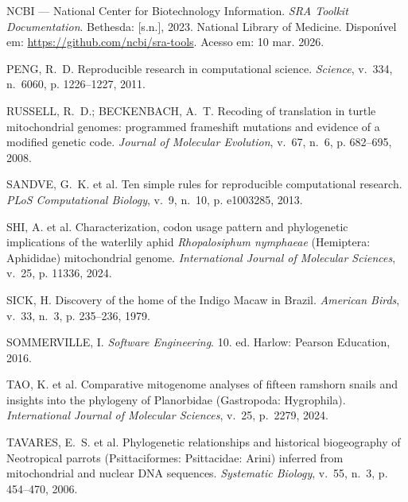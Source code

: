 \begin{thebibliography}{}
{{NCBI --- National Center for Biotechnology Information}. \emph{{SRA Toolkit
  Documentation}}. Bethesda: [s.n.], 2023. National Library of Medicine.
Dispon{\'\i}vel em: \url{https://github.com/ncbi/sra-tools}. Acesso em: 10 mar.
  2026.}

{PENG, R.~D. Reproducible research in computational science.
\emph{Science}, v.~334, n.~6060, p. 1226--1227, 2011.}

{RUSSELL, R.~D.; BECKENBACH, A.~T. Recoding of translation in turtle
  mitochondrial genomes: programmed frameshift mutations and evidence of a
  modified genetic code.
\emph{Journal of Molecular Evolution}, v.~67, n.~6, p. 682--695, 2008.}

{SANDVE, G.~K. et al. Ten simple rules for reproducible computational research.
\emph{PLoS Computational Biology}, v.~9, n.~10, p. e1003285, 2013.}

{SHI, A. et al. Characterization, codon usage pattern and phylogenetic
  implications of the waterlily aphid \textit{Rhopalosiphum nymphaeae}
  ({H}emiptera: {A}phididae) mitochondrial genome.
\emph{International Journal of Molecular Sciences}, v.~25, p. 11336, 2024.}

{SICK, H. Discovery of the home of the {I}ndigo {M}acaw in {B}razil.
\emph{American Birds}, v.~33, n.~3, p. 235--236, 1979.}

{SOMMERVILLE, I. \emph{Software Engineering}. 10. ed. Harlow: Pearson
  Education, 2016.}

{TAO, K. et al. Comparative mitogenome analyses of fifteen ramshorn snails and
  insights into the phylogeny of {P}lanorbidae ({G}astropoda: {H}ygrophila).
\emph{International Journal of Molecular Sciences}, v.~25, p.~2279, 2024.}

{TAVARES, E.~S. et al. Phylogenetic relationships and historical biogeography
  of {N}eotropical parrots ({P}sittaciformes: {P}sittacidae: {A}rini) inferred
  from mitochondrial and nuclear {DNA} sequences.
\emph{Systematic Biology}, v.~55, n.~3, p. 454--470, 2006.}


\end{thebibliography}
